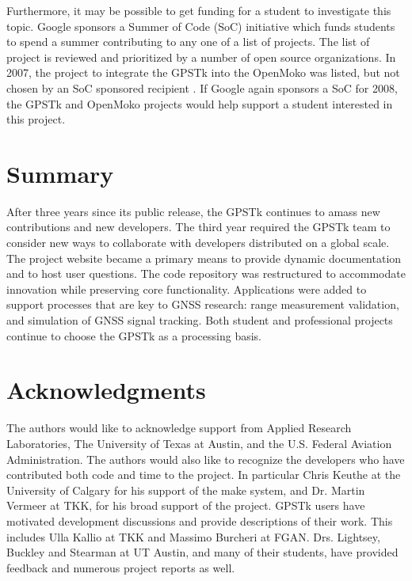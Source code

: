 \documentclass[letterpaper,ugly,10pt]{ion-gps}
\begin{document}
%

Furthermore, it may be possible to get funding for a student to investigate this topic. Google sponsors a Summer of Code (SoC) initiative which funds students to spend a summer contributing to any one of a list of projects. The list of project is reviewed and prioritized by a number of open source organizations. In 2007, the project to integrate the GPSTk into the OpenMoko was listed, but not chosen by an SoC sponsored recipient \cite{summerofcodemainsite,summerofcodeopenmokogpstk}. If Google again sponsors a SoC for 2008, the GPSTk and OpenMoko projects would help support a student interested in this project.


\section*{Summary}

After three years since its public release, the GPSTk continues to amass new contributions and new developers. The third year required the GPSTk team to consider new ways to collaborate with developers distributed on a global scale. The project website became a primary means to provide dynamic documentation and to host user questions. The code repository was restructured to accommodate innovation while preserving core functionality. Applications were added to support processes that are key to GNSS research: range measurement validation, and simulation of GNSS signal tracking. Both student and professional projects continue to choose the GPSTk as a processing basis.

\section*{Acknowledgments}

The authors would like to acknowledge support from Applied Research Laboratories, The University of Texas at Austin, and the U.S. Federal Aviation Administration. The authors would also like to recognize the developers who have contributed both code and time to the project. In particular Chris Keuthe at the University of Calgary for his support of the make system, and Dr. Martin Vermeer at TKK, for his broad support of the project. GPSTk users have motivated development discussions and provide descriptions of their work. This includes Ulla Kallio at TKK and Massimo Burcheri at FGAN. Drs. Lightsey, Buckley and Stearman at UT Austin, and many of their students, have provided feedback and numerous project reports as well.




\end{document}
